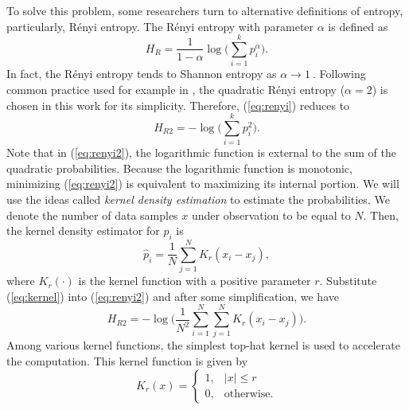 \documentclass[journal,comsoc]{IEEEtran}
\begin{document}
To solve this problem, some researchers turn to alternative definitions of entropy,
particularly, R\'enyi entropy.
The R\'enyi entropy  with parameter \(\alpha\) is defined as
\begin{equation}
H_{R }={\frac {1}{1-\alpha }}\log {\Bigg (}\sum _{i=1}^{k}p_{i}^{\alpha }{\Bigg )}.
\label{eq:renyi}
\end{equation}
In fact, the R\'enyi entropy tends to Shannon entropy as $\alpha \to 1~$\cite{Bromiley2004}.
Following common practice used for example in \cite{Santamaria2002}, the quadratic R\'enyi entropy ($\alpha=2$) is chosen in this work for its simplicity.
Therefore, (\ref{eq:renyi}) reduces to
\begin{equation}
H_{R2 }=-\log {\Bigg (}\sum _{i=1}^{k}p_{i}^{2 }{\Bigg )}.
\label{eq:renyi2}
\end{equation}
Note that in (\ref{eq:renyi2}), the logarithmic function is  external to the sum of the quadratic probabilities.
Because the logarithmic function is monotonic, minimizing (\ref{eq:renyi2}) is equivalent to maximizing its internal portion.
We will use the ideas called\textit{ kernel density estimation} to estimate the probabilities.
We denote the number of data samples $x$ under observation to be equal to \(N\).
Then, the kernel density estimator for $p_i$ is
\begin{equation}
{ {\hat {p}}_{i}={\frac {1}{N}}\sum _{j=1}^{N}K_{r}\left(x_i-x_j\right)},
\label{eq:kernel}
\end{equation}
where $K_r(\cdot)$ is the kernel function with a positive parameter $r$.
Substitute (\ref{eq:kernel}) into (\ref{eq:renyi2}) and after some simplification, we have
\begin{equation}
H_{R2 }=-\log {\Bigg (}\frac{1}{N^2}\sum _{i=1}^{N}\sum _{j=1}^{N}K_{r}\left(x_i-x_j\right){\Bigg )}.
\end{equation}
Among various kernel functions, the simplest top-hat kernel is used to accelerate the computation.
This kernel function is given by
\begin{equation}
{\displaystyle K_{r}(x)={\begin{cases}1,&|x|\leq r\\0,&{\mbox{otherwise.}}\end{cases}}}
\end{equation}
\end{document}
